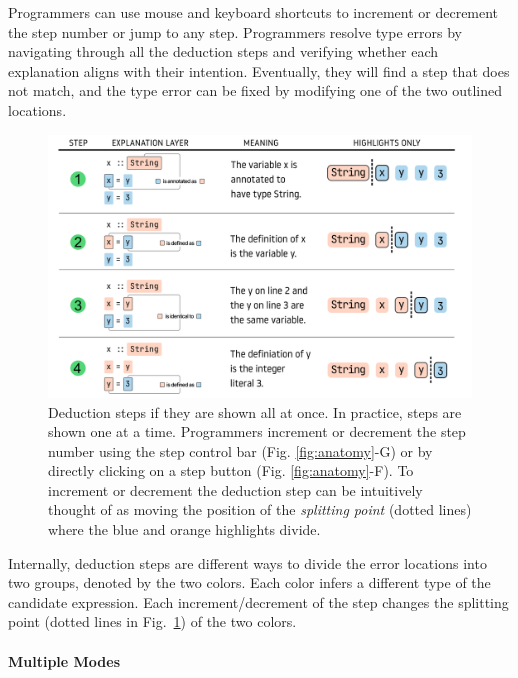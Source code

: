 Programmers can use mouse and keyboard shortcuts to increment or decrement the step number or jump to any step. Programmers resolve type errors by navigating through all the deduction steps and verifying whether each explanation aligns with their intention. Eventually, they will find a step that does not match, and the type error can be fixed by modifying one of the two outlined locations.

\begin{figure}
    \centering
    \includegraphics[width=\linewidth, trim=0mm 0mm 0mm 0mm]{images/step-explain.pdf}
    \caption{
Deduction steps if they are shown all at once. In practice, steps are shown one at a time. Programmers increment or decrement the step number using the step control bar (Fig. \ref{fig:anatomy}-G) or by directly clicking on a step button (Fig. \ref{fig:anatomy}-F). To increment or decrement the deduction step can be intuitively thought of as moving the position of the \textit{splitting point} (dotted lines) where the blue and orange highlights divide.
        }
    \label{fig:step-interface}
\end{figure}

Internally, deduction steps are different ways to divide the error locations into two  groups, denoted by the two colors. Each color infers a different type of the candidate expression. Each increment/decrement of the step changes the splitting point (dotted lines in Fig.~\ref{fig:step-interface}) of the two colors.


\paragraph{Multiple Modes}

